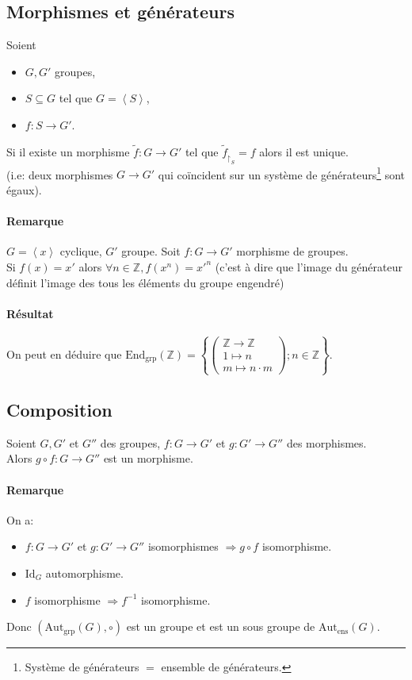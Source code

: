 \documentclass[a4paper,10pt]{report}
\newcommand{\mt}[1]{\widetilde{ #1 }} %
\newcommand{\grp}[1]{\left\langle #1 \right\rangle} %
\newcommand{\set}[1]{\left\lbrace #1 \right\rbrace } %
\newcommand{\IZ}{\mathbb{Z}} %
\newcommand{\so}{\Rightarrow}
\newcommand{\id}{\mathrm{Id}} %
\newcommand{\rstrct}[2]{{ #1 }_{\upharpoonright_{ #2 }}} %
\newcommand{\mfootnote}[1]{\up{(}\footnote{#1}\up{)}}
\newcommand{\Autgrp}[1]{\text{Aut}_{\text{grp}}\left(#1\right)}
\newcommand{\Autens}[1]{\text{Aut}_{\text{ens}}\left(#1\right)}
\begin{document}
   \subsection{Morphismes et générateurs}
    Soient
    \begin{itemize}
      \item $G, G'$ groupes,
      \item $S \subseteq G$ tel que $G=\grp{S}$,
      \item $f: S \to G'$.
    \end{itemize}
    Si il existe un morphisme $\mt{f}:G \to G'$ tel que
    $\rstrct{\mt{f}}{S}=f$ alors il est unique.\\
    (i.e: deux morphismes $G \to G'$ qui coïncident sur un système de
    générateurs\mfootnote{Système de générateurs $=$ ensemble de
    générateurs.} sont égaux).
    \begin{comment}
      \mfootnote{Preuve : 22/10/08 p1}
    \end{comment}

    \paragraph{Remarque}
     $G=\grp{x}$ cyclique, $G'$ groupe. Soit $f:G \to G'$ morphisme de
     groupes.\\
     Si $f(x)=x'$ alors $\forall n \in \IZ, f(x^n)=x'^n$ (c'est à dire que
     l'image du générateur définit l'image des tous les éléments du groupe
     engendré)

    \paragraph{Résultat}
     On peut en déduire que $\text{End}_{\text{grp}}(\IZ) = \set{\left(
     \begin{matrix}
       \IZ \to \IZ\\
       1 \mapsto n\\
       m \mapsto n\cdot m
     \end{matrix} \right); n \in \IZ}$.

   \subsection{Composition}
    Soient $G,G'$ et $G''$ des groupes, $f:G \to G'$ et $g:G' \to G''$ des
    morphismes.\\
    Alors $g\circ f: G \to G''$ est un morphisme.

    \paragraph{Remarque}
     On a: 
     \begin{itemize}
       \item $f:G\to G'$ et $g:G'\to G''$ isomorphismes $\so g\circ f$
         isomorphisme.
       \item $\id_G$ automorphisme.
       \item $f$ isomorphisme $\so f^{-1}$ isomorphisme.  
     \end{itemize}
     Donc $(\Autgrp{G},\circ)$ est un groupe et est un sous groupe
     de $\Autens{G}$.
\end{document}
